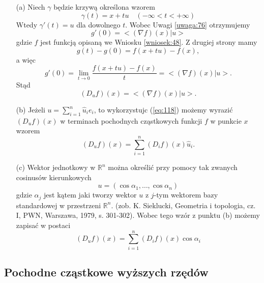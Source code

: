 \documentclass[leqno]{article}
\begin{document}
\begin{justify}
\begin{uwaga}
    \begin{itemize}
        \item [(a)]
            Niech $\gamma$ będzie krzywą określona wzorem 
            \[
                \gamma(t) = x + tu \quad (-\infty < t < + \infty)
            \]
            Wtedy $\gamma'(t) = u$ dla dowolnego $t$. Wobec Uwagi \ref{uwaga:76} otrzymujemy 
            \[
                g'(0) = <(\nabla f)(x) | u >
            \]
            gdzie $f$ jest funkcją opisaną we Wniosku \ref{wniosek:48}. Z drugiej strony mamy 
            \[
                g(t) - g(0) = f(x + tu) - f(x),
            \]
            a więc 
            \[
                g'(0) = \lim_{t \to 0}\frac{f(x + tu) - f(x)}{t} = <(\nabla f)(x) | u >.
            \]  
            Stąd 
            \begin{equation}\label{eq:128}
                (D_u f)(x) = <(\nabla f)(x) | u >.
            \end{equation}
        \item [(b)]
            Jeżeli $u = \sum_{i=1}^{n}\hat{u}_i e_i$, to wykorzystujc (\ref{eq:118}) możemy wyrazić 
            $(D_u f)(x)$ w terminach pochodnych cząstkowych funkcji $f$ w punkcie $x$ wzorem 
            \[
                (D_u f)(x) = \sum_{i=1}^{n}(D_i f)(x)\hat{u}_i.
            \]
        \item [(c)]
            Wektor jednotkowy w $\mathbb{R}^n$ można określić przy pomocy tak zwanych cosinusów kierunkowych
            \[
                u = (\cos \alpha_1, \ldots, \cos \alpha_n)
            \] 
            gdzie $\alpha_j$ jest kątem jaki tworzy wektor $u$ z $j$-tym wektorem bazy standardowej w przestrzeni $\mathbb{R}^n$. (zob. K. Sieklucki, Geometria i topologia, cz. I, PWN, Warszawa,
            1979, s. 301-302). Wobec tego wzór z punktu (b) możemy zapisać w postaci 
            \[
                (D_u f)(x) = \sum_{i=1}^{n}(D_i f)(x)\cos \alpha_i
            \]
    \end{itemize}
\end{uwaga}

\subsection{Pochodne cząstkowe wyższych rzędów}


\end{justify}
\end{document}
